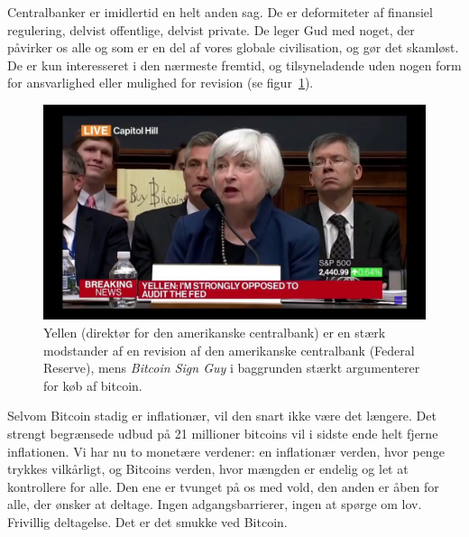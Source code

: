 \documentclass[paper=6in:9in,pagesize=pdftex,headinclude=on,footinclude=on,12pt]{scrbook}
\begin{document}
Centralbanker er imidlertid en helt anden sag. De er deformiteter af finansiel regulering, delvist offentlige, delvist private. De leger Gud med noget, der påvirker os alle og som er en del af vores globale civilisation, og gør det skamløst. De er kun interesseret i den nærmeste fremtid, og tilsyneladende uden nogen form for ansvarlighed eller mulighed for revision (se figur~\ref{fig:bsg}).

\begin{figure}
  \centering
  \includegraphics{assets/images/bsg.jpg}
  \caption{Yellen (direktør for den amerikanske centralbank) er en stærk modstander af en revision af den amerikanske centralbank (Federal Reserve), mens \textit{Bitcoin Sign Guy} i baggrunden stærkt argumenterer for køb af bitcoin.}
  \label{fig:bsg}
\end{figure}

Selvom Bitcoin stadig er inflationær, vil den snart ikke være det længere. Det strengt begrænsede udbud på 21 millioner bitcoins vil i sidste ende helt fjerne inflationen. Vi har nu to monetære verdener: en inflationær verden, hvor penge trykkes vilkårligt, og Bitcoins verden, hvor mængden er endelig og let at kontrollere for alle. Den ene er tvunget på os med vold, den anden er åben for alle, der ønsker at deltage. Ingen adgangsbarrierer, ingen at spørge om lov. Frivillig deltagelse. Det er det smukke ved Bitcoin.
\end{document}

